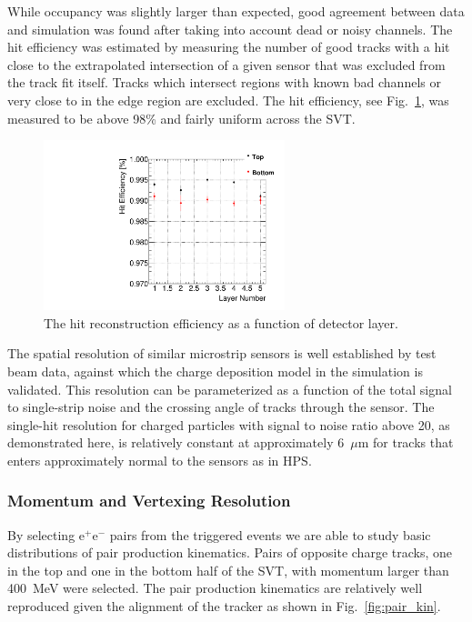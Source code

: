 \documentclass[final,3p,times,twocolumn]{elsarticle}
\newcommand{\ee}{e$^+$e$^-$}
\begin{document}
While occupancy was slightly larger than expected, good agreement between data and simulation was 
found after taking into account dead or noisy channels. The hit efficiency was estimated by measuring 
the number of good tracks with a hit close to the extrapolated intersection of a given sensor that was 
excluded from the track fit itself. Tracks which intersect regions with known bad channels or very close to 
in the edge region are excluded. The hit efficiency, see Fig.~\ref{fig:hit_efficiency}, was measured to be 
above 98\% and fairly uniform across the SVT.
\begin{figure}[]
\begin{center}
{\small
    	\includegraphics[width=7cm]{figures/single_hit_efficiency_Omar_11192013.pdf}
        \caption{ The hit reconstruction efficiency as a function of detector layer.}
	\label{fig:hit_efficiency}
}
\end{center}
\end{figure}
The spatial resolution of similar microstrip sensors is well established by test beam data, against which 
the charge deposition model in the simulation is validated.  This resolution can be parameterized as a 
function of the total signal to single-strip noise and the crossing angle of tracks through the sensor.  
The single-hit resolution for charged particles with signal to noise ratio above 20, as demonstrated 
here, is relatively constant at approximately 6~$\mu$m for tracks that enters approximately normal to the 
sensors as in HPS.



\subsubsection{Momentum and Vertexing Resolution}

By selecting \ee{} pairs from the triggered events we are able to study basic distributions of pair 
production kinematics. Pairs of opposite charge tracks, one in the top and one in the bottom half of the 
SVT, with momentum larger than 400~MeV were selected. The pair production kinematics are relatively 
well reproduced given the alignment of the tracker as shown in Fig.~\ref{fig:pair_kin}. 
\end{document}
